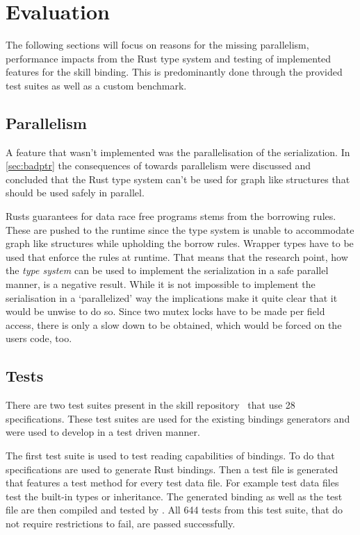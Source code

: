 \documentclass[thesis]{subfiles}
\begin{document}
\chapter{Evaluation}\label{chap:eval}
The following sections will focus on reasons for the missing parallelism, performance impacts from the Rust type system and testing of implemented features for the \gls{skill} binding.
This is predominantly done through the provided test suites as well as a custom benchmark.

\section{Parallelism}
  A feature that wasn't implemented was the parallelisation of the serialization.
  In \autoref{sec:badptr} the consequences of \PtrT towards parallelism were discussed and concluded that the Rust type system can't be used for graph like structures that should be used safely in parallel.

  Rusts guarantees for data race free programs stems from the borrowing rules.
  These are pushed to the runtime since the type system is unable to accommodate graph like structures while upholding the borrow rules.
  Wrapper types have to be used that enforce the rules at runtime.
  That means that the research point, how the \emph{type system} can be used to implement the serialization in a safe parallel manner, is a negative result.
  While it is not impossible to implement the serialisation in a `parallelized' way the implications make it quite clear that it would be unwise to do so.
  Since two mutex locks have to be made per field access, there is only a slow down to be obtained, which would be forced on the users code, too.

\section{Tests}
  There are two test suites present in the \gls{skill} repository~\autocite{skill-repo} that use 28 specifications.
  These test suites are used for the existing bindings generators and were used to develop in a test driven manner.

  The first test suite is used to test reading capabilities of bindings.
  To do that specifications are used to generate Rust bindings.
  Then a test file is generated that features a test method for every test data file.
  For example test data files test the built-in types or inheritance.
  The generated binding as well as the test file are then compiled and tested by .
  All 644 tests from this test suite, that do not require restrictions to fail, are passed successfully.
\end{document}
